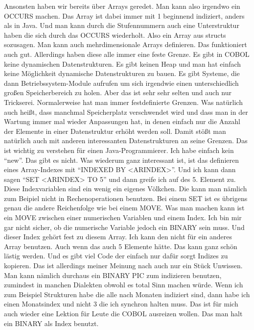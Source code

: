 {Ansonsten haben wir bereits über Arrays geredet. Man kann also irgendwo ein OCCURS machen. Das Array ist dabei immer mit 1 beginnend indiziert, anders als in Java. Und man kann durch die Stufennummern auch eine Unterstruktur haben die sich durch das OCCURS wiederholt. Also ein Array aus structs sozusagen. Man kann auch mehrdimensionale Arrays definieren. Das funktioniert auch gut. Allerdings haben diese alle immer eine feste Grenze. Es gibt in COBOL keine dynamischen Datenstrukturen. Es gibt keinen Heap und man hat einfach keine Möglichkeit dynamische Datenstrukturen zu bauen. Es gibt Systeme, die dann Betriebssystem-Module aufrufen um sich irgendwie einen unterschiedlich großen Speicherbereich zu holen. Aber das ist sehr sehr selten und auch nur Trickserei. Normalerweise hat man immer festdefinierte Grenzen. Was natürlich auch heißt, dass manchmal Speicherplatz verschwendet wird und dass man in der Wartung immer mal wieder Anpassungen hat, in denen einfach nur die Anzahl der Elemente in einer Datenstruktur erhöht werden soll. Damit stößt man natürlich auch mit anderen interessanten Datenstrukturen an seine Grenzen. Das ist wichtig zu verstehen für einen Java-Programmierer. Ich habe einfach kein ``new''. Das gibt es nicht. Was wiederum ganz interessant ist, ist das definieren eines Array-Indexes mit ``INDEXED BY <ARINDEX>''. Und ich kann dann sagen ``SET <ARINDEX> TO 5'' und dann greife ich auf des 5. Element zu. Diese Indexvariablen sind ein wenig ein eigenes Völkchen. Die kann man nämlich zum Beipiel nicht in Rechenoperationen benutzen. Bei einem SET ist es übrigens genau die andere Reichenfolge wie bei einem MOVE. Was man machen kann ist ein MOVE zwischen einer numerischen Variablen und einem Index. Ich bin mir gar nicht sicher, ob die numerische Variable jedoch ein BINARY sein muss. Und dieser Index gehört fest zu diesem Array. Ich kann den nicht für ein anderes Array benutzen. Auch wenn das auch 5 Elemente hätte. Das kann ganz schön lästig werden. Und es gibt viel Code der einfach nur dafür sorgt Indizes zu kopieren. Das ist allerdings meiner Meinung nach auch nur ein Stück Unwissen. Man kann nämlich durchaus ein BINARY PIC zum indizieren benutzen, zumindest in manchen Dialekten obwohl es total Sinn machen würde. Wenn ich zum Beispiel Strukturen habe die alle nach Monaten indiziert sind, dann habe ich einen Monatsindex und nicht 3 die ich synchron halten muss. Das ist für mich auch wieder eine Lektion für Leute die COBOL ausreizen wollen. Das man halt ein BINARY als Index benutzt. }


